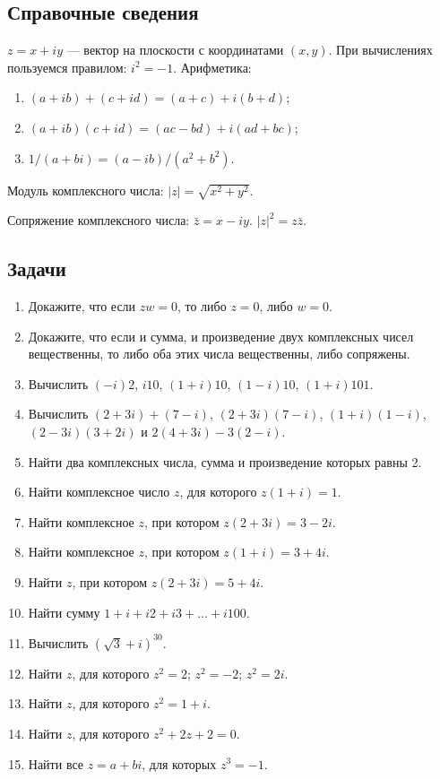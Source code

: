 
\subsection*{Справочные сведения}

\noindent $z=x+iy$ --- вектор на плоскости с координатами $(x,y)$. При вычислениях пользуемся правилом: $i^2=-1$. Арифметика:
\begin{enumerate}
\item $(a+ib)+(c+id)=(a+c)+i(b+d)$;
\item $(a+ib)(c+id)=(ac-bd)+i(ad+bc)$;
\item $1/(a+bi) = (a-ib)/(a^2+b^2)$.
\end{enumerate}

\noindent Модуль комплексного числа: $|z|=\sqrt{x^2+y^2}$.

\noindent Сопряжение комплексного числа: $\bar z=x-iy$. $|z|^2=z\bar z$.


\subsection*{Задачи}

\begin{enumerate}
\item Докажите, что если $zw = 0$, то либо $z = 0$, либо $w = 0$.
\item Докажите, что если и сумма, и произведение двух комплексных чисел вещественны, то
либо оба этих числа вещественны, либо сопряжены.

\item Вычислить $(-i)2$, $i10$, $(1 + i)10$, $(1 - i)10$, $(1 + i)101$.
\item Вычислить $(2 + 3i) + (7 - i)$, $(2 + 3i)(7 - i)$, $(1 + i)(1 - i)$,
$(2 - 3i)(3 + 2i)$ и $2(4 + 3i) - 3(2 - i)$.
\item Найти два комплексных числа, сумма и произведение которых равны 2.
\item Найти комплексное число $z$, для которого $z(1 + i) = 1$.
\item Найти комплексное $z$, при котором $z(2 + 3i) = 3 - 2i$.
\item Найти комплексное $z$, при котором $z(1 + i) = 3 + 4i$.

\item Найти $z$, при котором $z(2 + 3i) = 5 + 4i$.
\item Найти сумму $1 + i + i2 + i3 + \dots + i100$.
\item Вычислить $(\sqrt 3 + i)^{30}$.
\item Найти $z$, для которого \ipunkt $z^2 = 2$; \ipunkt $z^2 = -2$; \ipunkt $z^2 = 2i$.
\item Найти $z$, для которого $z^2 = 1 + i$.
\item Найти $z$, для которого $z^2 + 2z + 2 = 0$.
\item Найти все $z = a + bi$, для которых $z^3 = -1$.

\end{enumerate}




